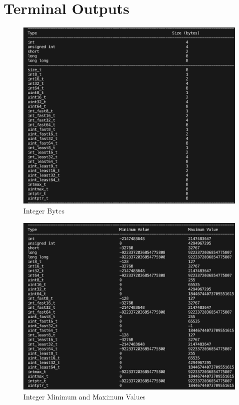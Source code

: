 \documentclass[12pt]{article}
\begin{document}
\section{Terminal Outputs}
\begin{figure}[h]
    \centering
    \includegraphics[width=1\textwidth]{intByte.png} 
    \caption{Integer Bytes}
    \label{fig:example-image}
\end{figure}
\begin{figure}[h]
    \centering
    \includegraphics[width=1\textwidth]{intMinMax.png} 
    \caption{Integer Minimum and Maximum Values}
    \label{fig:example-image}
\end{figure}
\end{document}
